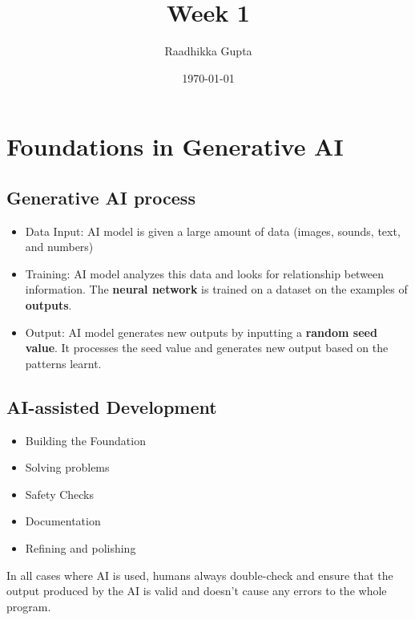 \documentclass[12pt, letterpaper]{article}
\title{Week 1}
\author{Raadhikka Gupta}
\date{\today}
\begin{document}
\maketitle

\section{Foundations in Generative AI}

\subsection{Generative AI process}
\begin{itemize}
    \item Data Input: AI model is given a large amount of data (images, sounds, text, and numbers)
    \item Training: AI model analyzes this data and looks for relationship between information. The \textbf{neural network} is trained on a dataset on the examples of \textbf{outputs}.
    \item Output: AI model generates new outputs by inputting a \textbf{random seed value}. It processes the seed value and generates new output based on the patterns learnt. 
\end{itemize}

\subsection{AI-assisted Development}
\begin{itemize}
    \item Building the Foundation
    \item Solving problems
    \item Safety Checks
    \item Documentation
    \item Refining and polishing
\end{itemize}
In all cases where AI is used, humans always double-check and ensure that the output produced by the AI is valid and doesn't cause any errors to the whole program.
\end{document}
